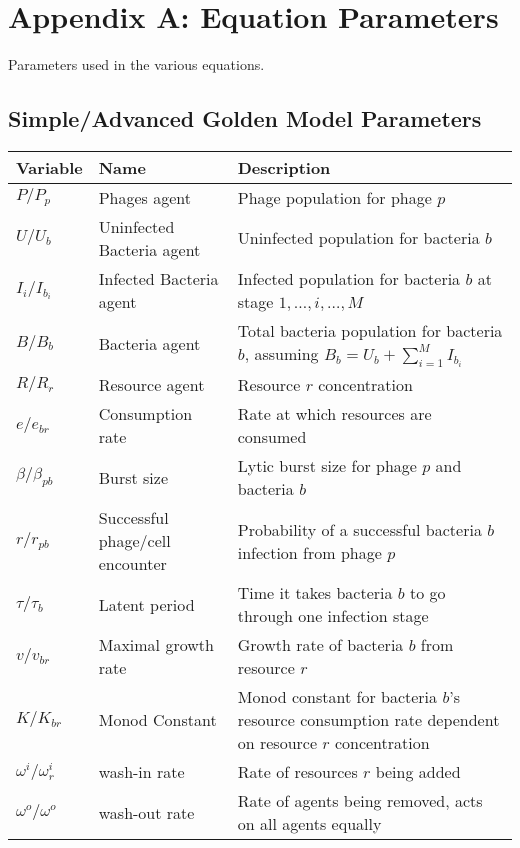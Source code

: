 \chapter{Appendix A: Equation Parameters}
\label{AppendixA}
Parameters used in the various equations. 

\section{Simple/Advanced Golden Model Parameters}
\begin{table}[h!]
    \small %
    \centering
    \begin{tabularx}{\textwidth}{l l X}
        \toprule
        \textbf{Variable} & \textbf{Name} & \textbf{Description} \\
        \midrule
        $P / P_p$ & Phages agent & Phage population for phage $p$ \\
        $U / U_b$ & Uninfected Bacteria agent & Uninfected population for bacteria $b$ \\
        $I_i / I_{b_i}$ & Infected Bacteria agent & Infected population for bacteria $b$ at stage $1, \dots, i, \dots, M$ \\
        $B / B_b$ & Bacteria agent & Total bacteria population for bacteria $b$, assuming $B_b = U_b + \sum_{i=1}^M I_{b_i}$ \\
        $R / R_r$ & Resource agent & Resource $r$ concentration\\
        $e / e_{b r}$ & Consumption rate& Rate at which resources are consumed\\
        $\beta / \beta_{p b}$ & Burst size & Lytic burst size for phage $p$ and bacteria $b$\\
        $r / r_{p b}$ & Successful phage/cell encounter & Probability of a successful bacteria $b$ infection from phage $p$\\
        $\tau / \tau_{b}$ & Latent period & Time it takes bacteria $b$ to go through one infection stage\\
        $v / v_{b r}$ & Maximal growth rate & Growth rate of bacteria $b$ from resource $r$ \\
        $K / K_{b r}$ & Monod Constant & Monod constant for bacteria $b$'s resource consumption rate dependent on resource $r$ concentration\\
        $\omega^i / \omega^i_r$ & wash-in rate & Rate of resources $r$ being added\\
        $\omega^o / \omega^o$ & wash-out rate & Rate of agents being removed, acts on all agents equally\\

\end{tabularx}
\end{table}

